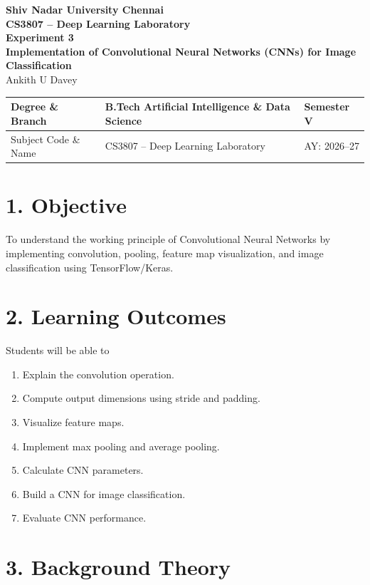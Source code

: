 \documentclass[11pt]{article}
\begin{document}
\begin{center}
{\Large\textbf{Shiv Nadar University Chennai}}\\
\textbf{CS3807 -- Deep Learning Laboratory}\\
\textbf{Experiment 3}\\
{\large\textbf{Implementation of Convolutional Neural Networks (CNNs) for Image Classification}}\\[6pt]
Ankith U Davey 
\end{center}

\renewcommand{\arraystretch}{1.25}

\begin{tabular}{|p{3.8cm}|p{8cm}|p{2cm}|}
\hline
Degree \& Branch & B.Tech Artificial Intelligence \& Data Science & Semester V\\ \hline
Subject Code \& Name & CS3807 -- Deep Learning Laboratory & AY: 2026--27\\ \hline
\end{tabular}

\section*{1. Objective}

To understand the working principle of Convolutional Neural Networks by implementing convolution, pooling, feature map visualization, and image classification using TensorFlow/Keras.

\section*{2. Learning Outcomes}

Students will be able to

\begin{enumerate}
\item Explain the convolution operation.
\item Compute output dimensions using stride and padding.
\item Visualize feature maps.
\item Implement max pooling and average pooling.
\item Calculate CNN parameters.
\item Build a CNN for image classification.
\item Evaluate CNN performance.
\end{enumerate}

\section*{3. Background Theory}
\end{document}

